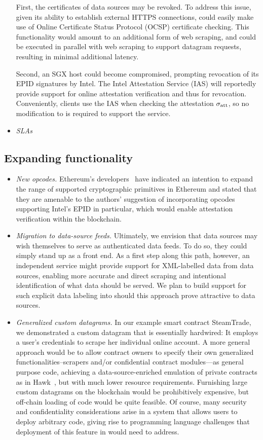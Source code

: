 \begin{itemize}
First, the certificates of data sources may be revoked. To address this issue, given its ability to establish external HTTPS connections, \tc could easily make use of Online Certificate Status Protocol (OCSP) certificate checking. This functionality would amount to an additional form of web scraping, and could be executed in parallel with web scraping to support datagram requests, resulting in minimal additional latency.

Second, an SGX host could become compromised, prompting revocation of its EPID signatures by Intel. The Intel Attestation Service (IAS) will reportedly provide support for online attestation verification and thus for revocation. Conveniently, clients use the IAS when checking the attestation ${\sigma_{\textrm{att}}}$, so no modification to \tc is required to support the service.


\item{\em SLAs}
\end{itemize}

\subsection{Expanding \tc functionality}

\begin{itemize}
\item{\em New opcodes.} Ethereum's developers~\cite{Buterinpersonal} have indicated an intention to expand the range of supported cryptographic primitives in Ethereum and stated that they are amenable to the authors' suggestion of incorporating opcodes supporting Intel's EPID in particular, which would enable attestation verification within the blockchain. 
\item{\em Migration to data-source feeds.} Ultimately, we envision that data sources may wish themselves to serve as authenticated data feeds. To do so, they could simply stand up \tc as a front end. As a first step along this path, however, an independent \tc service might provide support for XML-labelled data from data sources, enabling more accurate and direct scraping and intentional identification of what data should be served. We plan to build support for such explicit data labeling into \tc should this approach prove attractive to data sources.
\item{\em Generalized custom datagrams.} In our example smart contract {\sf SteamTrade}, we demonstrated a custom datagram that is essentially hardwired: It employs a user's credentials to scrape her individual online account. A more general approach would be to allow contract owners to specify their own generalized functionalities--scrapers and/or confidential contract modules---as general purpose code, achieving a data-source-enriched emulation of private contracts as in Hawk~\cite{hawk}, but with much lower resource requirements. Furnishing large custom datagrams on the blockchain would be prohibitively expensive, but off-chain loading of code would be quite feasible. Of course, many security and confidentiality considerations arise in a system that allows users to deploy arbitrary code, giving rise to programming language challenges that deployment of this feature in \tc would need to address.
\end{itemize}


